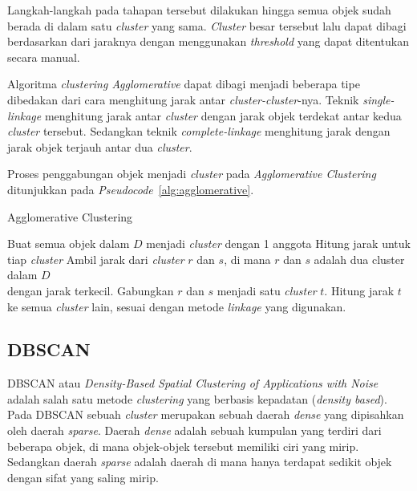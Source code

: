 Langkah-langkah pada tahapan tersebut dilakukan hingga semua objek sudah berada di dalam satu \textit{cluster} yang sama. \textit{Cluster} besar tersebut lalu dapat dibagi berdasarkan dari jaraknya dengan menggunakan \textit{threshold} yang dapat ditentukan secara manual.

Algoritma \textit{clustering Agglomerative} dapat dibagi menjadi beberapa tipe dibedakan dari cara menghitung jarak antar \textit{cluster-cluster}-nya. Teknik \textit{single-linkage} menghitung jarak antar \textit{cluster} dengan jarak objek terdekat antar kedua \textit{cluster} tersebut. Sedangkan teknik \textit{complete-linkage} menghitung jarak dengan jarak objek terjauh antar dua \textit{cluster}.

Proses penggabungan objek menjadi \textit{cluster} pada \textit{Agglomerative Clustering} ditunjukkan pada \textit{Pseudocode}~\ref{alg:agglomerative}. \\
\begin{algorithm}[H]
	\caption{Agglomerative Clustering}
	\label{alg:agglomerative}
	\begin{algorithmic}[1]
		\STATE Buat semua objek dalam $D$ menjadi \textit{cluster} dengan 1 anggota
		\STATE Hitung jarak untuk tiap \textit{cluster}
		\STATE Ambil jarak dari \textit{cluster} $r$ dan $s$, di mana $r$ dan $s$ adalah dua cluster dalam $D$ \\ dengan jarak terkecil.
		\STATE Gabungkan $r$ dan $s$ menjadi satu \textit{cluster} $t$. 
		\STATE Hitung jarak $t$ ke semua \textit{cluster} lain, sesuai dengan metode \textit{linkage} yang digunakan.
		\ENDWHILE
	\end{algorithmic}
\end{algorithm}

\subsection{DBSCAN}
\label{subsec:clustering_dbscan}
DBSCAN atau \textit{Density-Based Spatial Clustering of Applications with Noise} adalah salah satu metode \textit{clustering} yang berbasis kepadatan (\textit{density based}). Pada DBSCAN sebuah \textit{cluster} merupakan sebuah daerah \textit{dense} yang dipisahkan oleh daerah \textit{sparse}. Daerah \textit{dense} adalah sebuah kumpulan yang terdiri dari beberapa objek, di mana objek-objek tersebut memiliki ciri yang mirip. Sedangkan daerah \textit{sparse} adalah daerah di mana hanya terdapat sedikit objek dengan sifat yang saling mirip.

